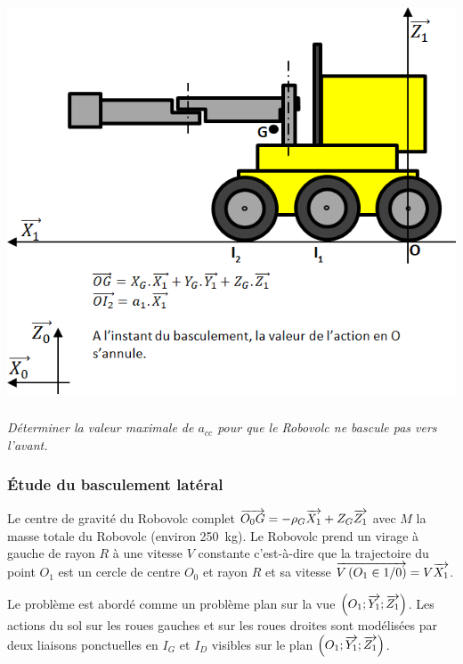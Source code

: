 \documentclass[10pt,fleqn]{article} %
\begin{document}
\begin{multicols}{2}
\begin{hypo}
\end{hypo}


\begin{center}
\includegraphics[width=\linewidth]{images/fig_05}
\end{center}

\subparagraph{}
\textit{Déterminer la valeur maximale de $a_{cc}$ pour que le Robovolc ne bascule pas vers l’avant.}
\ifprof
\begin{corrige}
\end{corrige}
\else
\fi

\subsubsection*{Étude du basculement latéral}
Le centre de gravité du Robovolc complet $\overrightarrow{O_0 G} = -\rho_G\overrightarrow{X_1}+Z_G\overrightarrow{Z_1}$ avec $M$ la masse totale du Robovolc (environ \SI{250}{kg}). 
Le Robovolc prend un virage à gauche de rayon $R$ à une vitesse $V$ constante c'est-à-dire que la trajectoire du point $O_1$ est un cercle de centre $O_0$ et rayon $R$ et sa vitesse $\overrightarrow{V\left( {O_1} \in {1}/{0}\right)}=V\overrightarrow{X_1}$.

\begin{hypo}
Le problème est abordé comme un problème plan sur la vue $\left(O_1;\overrightarrow{Y_1};\overrightarrow{Z_1}\right)$. Les actions du sol sur les roues gauches et sur les roues droites sont modélisées par deux liaisons ponctuelles en $I_G$ et $I_D$ visibles sur le plan $\left(O_1;\overrightarrow{Y_1};\overrightarrow{Z_1}\right)$.


\end{hypo}
\end{multicols}
\end{document}
